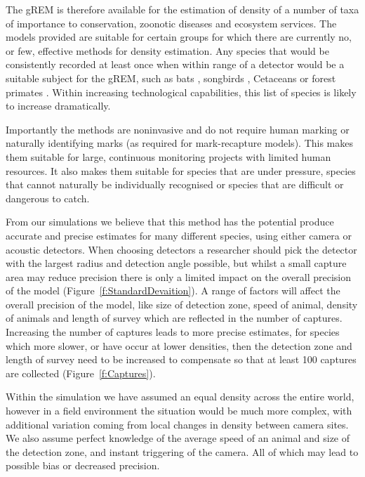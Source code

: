 \documentclass[a4paper,10pt,reqno,oneside]{amsart}
\begin{document}
The gREM is therefore available for the estimation of density of a number of taxa of importance to conservation, zoonotic diseases and ecosystem services. The models provided are suitable for certain groups for which there are currently no, or few, effective methods for density estimation. Any species that would be consistently recorded at least once when within range of a detector would be a suitable subject for the gREM, such as bats \citep{kunz2009methods}, songbirds \citep{buckland2006point}, Cetaceans \citep{marques2009estimating} or forest primates \citep{hassel2008reliable}. Within increasing technological capabilities, this list of species is likely to increase dramatically.

Importantly the methods are noninvasive and do not require human marking or naturally identifying marks (as required for mark-recapture models). This makes them suitable for large, continuous monitoring projects with limited human resources. It also makes them suitable for species that are under pressure, species that cannot naturally be individually recognised or species that are difficult or dangerous to catch.

From our simulations  we believe that this method has the potential produce accurate and precise estimates for many different species, using either camera or acoustic detectors. When choosing detectors a researcher should pick the detector with the largest radius and detection angle possible, but whilst a small capture area may reduce precision there is only a limited impact on the overall precision of the model (Figure~\ref{f:StandardDevaition}). A range of factors will affect the overall precision of the model, like size of detection zone, speed of animal, density of animals and length of survey which are reflected in the number of captures. Increasing the number of captures leads to more precise estimates, for species which more slower, or have occur at lower densities, then the detection zone and length of survey need to be increased to compensate so that at least 100 captures are collected (Figure~\ref{f:Captures}).

Within the simulation we have assumed an equal density across the entire world, however in a field environment the situation would be much more complex, with additional variation coming from local changes in density between camera sites. We also assume perfect knowledge of the average speed of an animal and size of the detection zone, and instant triggering of the camera. All of which may lead to possible bias or decreased precision.    
\end{document}
